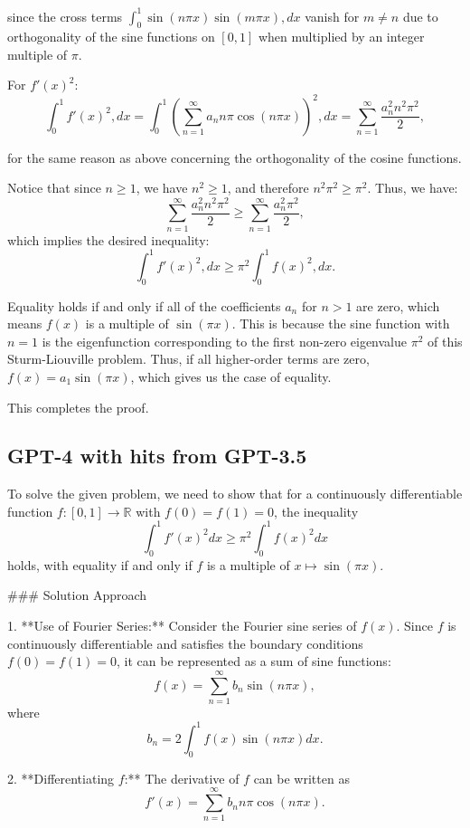 \documentclass{article}
\begin{document}
since the cross terms $\int_{0}^{1} \sin(n \pi x)\sin(m \pi x) , dx$ vanish for $m \neq n$ due to orthogonality of the sine functions on $[0,1]$ when multiplied by an integer multiple of $\pi$.

For $f'(x)^2$: $$ \int_{0}^{1} f'(x)^2 , dx = \int_{0}^{1} \left(\sum_{n=1}^\infty a_n n \pi \cos(n \pi x)\right)^2 , dx = \sum_{n=1}^\infty \frac{a_n^2 n^2 \pi^2}{2}, $$

for the same reason as above concerning the orthogonality of the cosine functions.

Notice that since $n \geq 1$, we have $n^2 \geq 1$, and therefore $n^2 \pi^2 \geq \pi^2$. Thus, we have: $$ \sum_{n=1}^\infty \frac{a_n^2 n^2 \pi^2}{2} \geq \sum_{n=1}^\infty \frac{a_n^2 \pi^2}{2}, $$ which implies the desired inequality: $$ \int_{0}^{1} f'(x)^2 , dx \geq \pi^2 \int_{0}^{1} f(x)^2 , dx. $$

Equality holds if and only if all of the coefficients $a_n$ for $n > 1$ are zero, which means $f(x)$ is a multiple of $\sin(\pi x)$. This is because the sine function with $n = 1$ is the eigenfunction corresponding to the first non-zero eigenvalue $\pi^2$ of this Sturm-Liouville problem. Thus, if all higher-order terms are zero, $f(x) = a_1 \sin(\pi x)$, which gives us the case of equality.

This completes the proof.

\subsection{GPT-4 with hits from GPT-3.5}

To solve the given problem, we need to show that for a continuously differentiable function \( f : [0,1] \rightarrow \mathbb{R} \) with \( f(0) = f(1) = 0 \), the inequality
$$
\int_{0}^{1} f'(x)^{2} dx \geq \pi^{2} \int_{0}^{1} f(x)^{2} dx
$$
holds, with equality if and only if \( f \) is a multiple of \( x \mapsto \sin(\pi x) \).

### Solution Approach

1. **Use of Fourier Series:** Consider the Fourier sine series of \( f(x) \). Since \( f \) is continuously differentiable and satisfies the boundary conditions \( f(0) = f(1) = 0 \), it can be represented as a sum of sine functions:
   $$
   f(x) = \sum_{n=1}^{\infty} b_n \sin(n\pi x),
   $$
   where
   $$
   b_n = 2 \int_{0}^{1} f(x) \sin(n\pi x) dx.
   $$

2. **Differentiating \( f \):** The derivative of \( f \) can be written as
   $$
   f'(x) = \sum_{n=1}^{\infty} b_n n\pi \cos(n\pi x).
   $$
\end{document}

